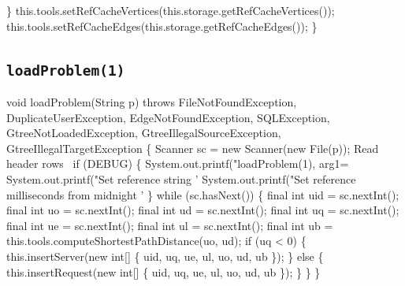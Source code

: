   \}
  this.tools.setRefCacheVertices(this.storage.getRefCacheVertices());
  this.tools.setRefCacheEdges(this.storage.getRefCacheEdges());
\}
\nwendcode{}\nwdocspar

\subsection{\texttt{loadProblem(1)}}
\nwenddocs{}\endmoddef{}
void loadProblem(String p)
throws FileNotFoundException, DuplicateUserException, EdgeNotFoundException, SQLException,
       GtreeNotLoadedException, GtreeIllegalSourceException, GtreeIllegalTargetException \{
  Scanner sc = new Scanner(new File(p));
  \LA{}Read header rows~{\nwtagstyle{}}\RA{}
  if (DEBUG) \{
    System.out.printf("loadProblem(1), arg1=%
    System.out.printf("Set reference string '%
    System.out.printf("Set reference milliseconds from midnight '%
  \}
  while (sc.hasNext()) \{
    final int uid = sc.nextInt();
    final int  uo = sc.nextInt();
    final int  ud = sc.nextInt();
    final int  uq = sc.nextInt();
    final int  ue = sc.nextInt();
    final int  ul = sc.nextInt();
    final int  ub = this.tools.computeShortestPathDistance(uo, ud);
    if (uq < 0) \{
      this.insertServer(new int[] \{ uid, uq, ue, ul, uo, ud, ub \});
    \} else \{
      this.insertRequest(new int[] \{ uid, uq, ue, ul, uo, ud, ub \});
    \}
  \}
\}
\eatline
{}\nwendcode{}\nwdocspar
